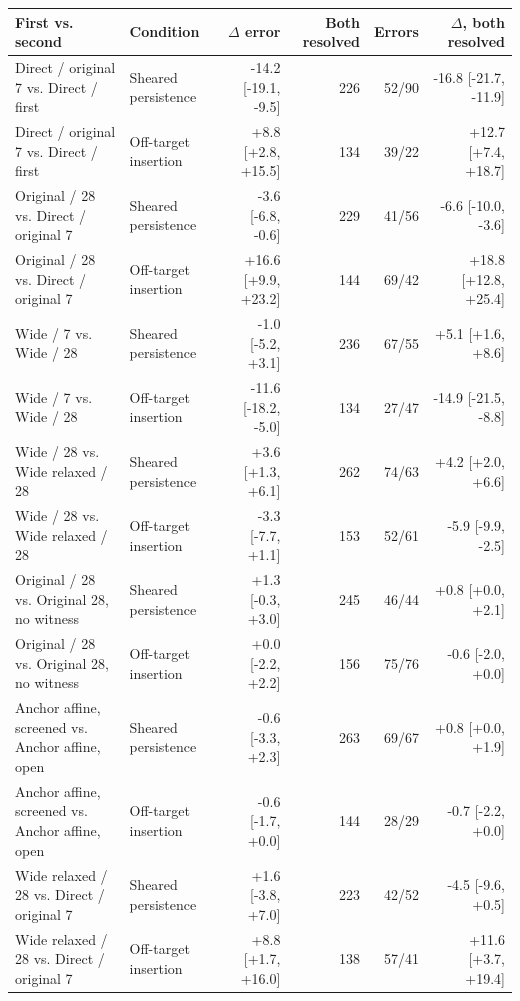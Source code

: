\begin{tabular}{@{}llrrrr@{}}
\toprule
First vs. second & Condition & $\Delta$ error & Both resolved & Errors & $\Delta$, both resolved \\
\midrule
Direct / original 7 vs. Direct / first & Sheared persistence & -14.2 [-19.1, -9.5] & 226 & 52/90 & -16.8 [-21.7, -11.9] \\
Direct / original 7 vs. Direct / first & Off-target insertion & +8.8 [+2.8, +15.5] & 134 & 39/22 & +12.7 [+7.4, +18.7] \\
Original / 28 vs. Direct / original 7 & Sheared persistence & -3.6 [-6.8, -0.6] & 229 & 41/56 & -6.6 [-10.0, -3.6] \\
Original / 28 vs. Direct / original 7 & Off-target insertion & +16.6 [+9.9, +23.2] & 144 & 69/42 & +18.8 [+12.8, +25.4] \\
Wide / 7 vs. Wide / 28 & Sheared persistence & -1.0 [-5.2, +3.1] & 236 & 67/55 & +5.1 [+1.6, +8.6] \\
Wide / 7 vs. Wide / 28 & Off-target insertion & -11.6 [-18.2, -5.0] & 134 & 27/47 & -14.9 [-21.5, -8.8] \\
Wide / 28 vs. Wide relaxed / 28 & Sheared persistence & +3.6 [+1.3, +6.1] & 262 & 74/63 & +4.2 [+2.0, +6.6] \\
Wide / 28 vs. Wide relaxed / 28 & Off-target insertion & -3.3 [-7.7, +1.1] & 153 & 52/61 & -5.9 [-9.9, -2.5] \\
Original / 28 vs. Original 28, no witness & Sheared persistence & +1.3 [-0.3, +3.0] & 245 & 46/44 & +0.8 [+0.0, +2.1] \\
Original / 28 vs. Original 28, no witness & Off-target insertion & +0.0 [-2.2, +2.2] & 156 & 75/76 & -0.6 [-2.0, +0.0] \\
Anchor affine, screened vs. Anchor affine, open & Sheared persistence & -0.6 [-3.3, +2.3] & 263 & 69/67 & +0.8 [+0.0, +1.9] \\
Anchor affine, screened vs. Anchor affine, open & Off-target insertion & -0.6 [-1.7, +0.0] & 144 & 28/29 & -0.7 [-2.2, +0.0] \\
Wide relaxed / 28 vs. Direct / original 7 & Sheared persistence & +1.6 [-3.8, +7.0] & 223 & 42/52 & -4.5 [-9.6, +0.5] \\
Wide relaxed / 28 vs. Direct / original 7 & Off-target insertion & +8.8 [+1.7, +16.0] & 138 & 57/41 & +11.6 [+3.7, +19.4] \\
\bottomrule
\end{tabular}
